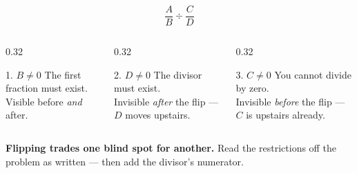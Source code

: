 \documentclass[aspectratio=169, 11pt]{beamer}
\begin{document}
\begin{frame}[t, plain]
  \begin{center}
    \[ \frac{A}{B}\div\frac{C}{D} \]
  \end{center}
  \vspace{-4pt}
  \begin{columns}[T]
    \begin{column}{0.32\textwidth}
      \begin{block}{1. $B\neq0$}
        The first fraction must exist. \\[3pt]
        {\footnotesize Visible before \emph{and} after.}
      \end{block}
    \end{column}
    \begin{column}{0.32\textwidth}
      \begin{block}{2. $D\neq0$}
        The divisor must exist. \\[3pt]
        {\footnotesize Invisible \emph{after} the flip --- $D$ moves upstairs.}
      \end{block}
    \end{column}
    \begin{column}{0.32\textwidth}
      \begin{block}{3. $C\neq0$}
        You cannot divide by zero. \\[3pt]
        {\footnotesize Invisible \emph{before} the flip --- $C$ is upstairs already.}
      \end{block}
    \end{column}
  \end{columns}
  \vspace{6pt}
  \begin{center}
    \textbf{Flipping trades one blind spot for another.} Read the restrictions off the problem as
    written --- then add the divisor's numerator.
  \end{center}
\end{frame}
\end{document}
